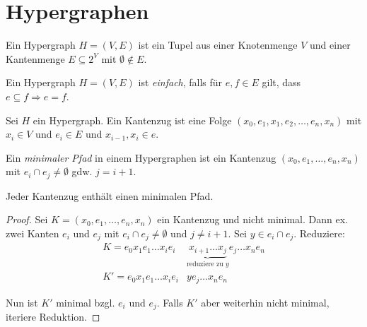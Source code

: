 \chapter{Hypergraphen}
\label{chpt:hypergraphs}

\begin{definition}[Hypergraph]
    Ein Hypergraph $ H = (V, E) $ ist ein Tupel aus einer Knotenmenge $ V $ und einer Kantenmenge $ E \subseteq 2^V $ mit $ \emptyset \notin E $.
\end{definition}

\begin{definition}[Einfach]
    Ein Hypergraph $ H = (V, E) $ ist \textit{einfach}, falls für $ e, f \in E $ gilt, dass $ e \subseteq f \Rightarrow e = f $.
\end{definition}

\begin{definition}
    Sei $ H $ ein Hypergraph.
    Ein Kantenzug ist eine Folge $ (x_0, e_1, x_1, e_2, \dots, e_n, x_n) $ mit $ x_i \in V $ und $ e_i \in E $ und $ x_{i - 1}, x_i \in e $.
\end{definition}

\begin{definition}
    Ein \textit{minimaler Pfad} in einem Hypergraphen ist ein Kantenzug $ (x_0, e_1, \dots, e_n, x_n) $ mit $ e_i \cap e_j \ne \emptyset $ gdw. $ j = i + 1 $.
\end{definition}

\begin{lemma}
    Jeder Kantenzug enthält einen minimalen Pfad.
\end{lemma}

\begin{proof}
    Sei $ K = (x_0, e_1, \dots, e_n, x_n) $ ein Kantenzug und nicht minimal.
    Dann ex. zwei Kanten $ e_i $ und $ e_j $ mit $ e_i \cap e_j \ne \emptyset $ und $ j \ne i + 1 $.
    Sei $ y \in e_i \cap e_j $.
    Reduziere:
    \begin{align*}
        K = e_0 x_1 e_1 \dots x_i e_i & \underbrace{x_{i + 1} \dots x_j}_{\text{reduziere zu } y} e_j \dots x_n e_n \\
        K' = e_0 x_1 e_1 \dots x_i e_i & y e_j \dots x_n e_n
    \end{align*}

    Nun ist $ K' $ minimal bzgl. $ e_i $ und $ e_j $.
    Falls $ K' $ aber weiterhin nicht minimal, iteriere Reduktion.
\end{proof}


